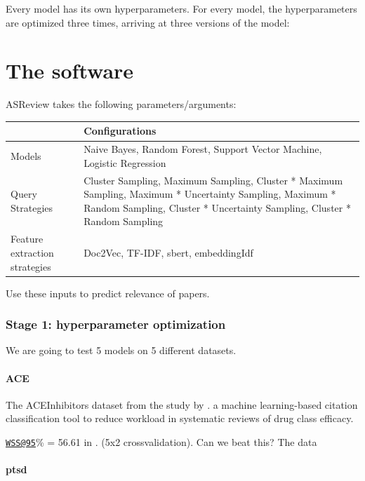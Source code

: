\documentclass[
]{book}
\begin{document}
Every model has its own hyperparameters.
For every model, the hyperparameters are optimized three times, arriving at three versions of the model:

\hypertarget{the-software}{%
\chapter{The software}\label{the-software}}

ASReview takes the following parameters/arguments:

\begin{tabu} to 
\toprule
  & Configurations\\
\midrule
Models & Naive Bayes, Random Forest, Support Vector Machine, Logistic Regression\\
Query Strategies & Cluster Sampling, Maximum Sampling, Cluster * Maximum  Sampling, Maximum * Uncertainty Sampling, Maximum * Random Sampling, Cluster * Uncertainty Sampling, Cluster * Random Sampling\\
Feature extraction strategies & Doc2Vec, TF-IDF, sbert, embeddingIdf\\
\bottomrule
\end{tabu}

Use these inputs to predict relevance of papers.

\hypertarget{stage-1-hyperparameter-optimization-1}{%
\subsection{Stage 1: hyperparameter optimization}\label{stage-1-hyperparameter-optimization-1}}

We are going to test 5 models on 5 different datasets.

\hypertarget{ace}{%
\subsubsection{ACE}\label{ace}}

The ACEInhibitors dataset from the study by \citep{Cohen2006}. a machine learning-based citation classification tool to reduce workload in systematic reviews of drug class efficacy.

\href{mailto:WSS@95}{\nolinkurl{WSS@95}}\% = 56.61 in \citep{Cohen2006}. (5x2 crossvalidation). Can we beat this?
The data

\hypertarget{ptsd}{%
\subsubsection{ptsd}\label{ptsd}}
\end{document}
